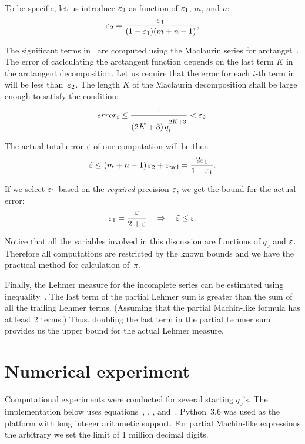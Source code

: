 \documentclass[draft, 11pt]{article} %
\begin{document}
To be specific, let us introduce $\varepsilon_2$ as function of $\varepsilon_1$, $m$, and $n$:
$$
\varepsilon_2 = \displaystyle\frac{\varepsilon_1}{(1-\varepsilon_1)(m+n-1)},
$$

The significant terms in~ are computed using the Maclaurin series for
arctanget~. The error of caclculating the arctangent function
depends on the last term $K$ in the arctangent decomposition.
Let us require that the error for each $i$-th term in~
will be less than~$\varepsilon_2$. The length $K$ of the Maclaurin decomposition
shall be large enough to satisfy the condition:
$$
error_i \le \displaystyle\frac{1}{(2K+3) \, q_i^{2K+3\strut}} < \varepsilon_2.
$$

The actual total error $\tilde{\varepsilon}$ of our computation will be then
$$
\tilde{\varepsilon} \le (m+n-1) \, \varepsilon_2 + \varepsilon_{\mathrm{tail}} = \displaystyle\frac{2 \varepsilon_1}{1-\varepsilon_1}.
$$

If we select $\varepsilon_1$ based on the {\it required\/} precision $\varepsilon$, we get the bound for
the actual error:
$$
\varepsilon_1 = \displaystyle\frac{\varepsilon}{2+\varepsilon} \quad\Rightarrow\quad \tilde{\varepsilon} \le \varepsilon.
$$

Notice that all the variables involved in this discussion are functions of $q_0$ and $\varepsilon$.
Therefore all computations are restricted by the known bounds and we have the practical
method for calculation of~$\pi$.

Finally, the Lehmer measure for the incomplete series can be estimated using
inequality~. The last term of the partial Lehmer sum is greater than
the sum of all the trailing Lehmer terms.
(Assuming that the partial Machin-like formula has at least $2$ terms.)
Thus, doubling the last term in the partial Lehmer sum
provides us the upper bound for the actual Lehmer measure.

\section{Numerical experiment}

Computational experiments were conducted for several starting $q_0$'s.
The implementation below uses equations~,
, , and~.
Python~3.6 was used as the platform with long integer arithmetic support.
For partial Machin-like expressions the arbitrary we set the limit of 1 million decimal digits.
\end{document}
